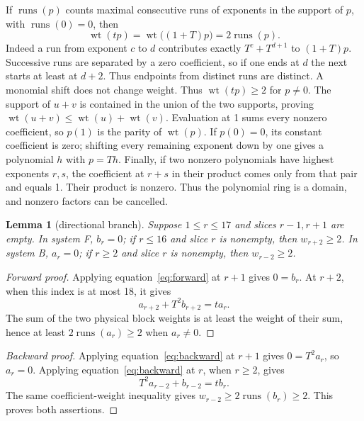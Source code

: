 \documentclass{article}
\newtheorem{lemma}{Lemma}
\DeclareMathOperator{\wt}{wt}
\DeclareMathOperator{\runs}{runs}
\begin{document}
If \(\runs(p)\) counts maximal consecutive runs of exponents in the support of
\(p\), with \(\runs(0)=0\), then
\begin{equation}\label{eq:runs}
  \wt(tp)=\wt\bigl((1+T)p\bigr)=2\runs(p).
\end{equation}
Indeed a run from exponent \(c\) to \(d\) contributes exactly \(T^c+T^{d+1}\)
to \((1+T)p\). Successive runs are separated by a zero coefficient, so if one
ends at \(d\) the next starts at least at \(d+2\). Thus endpoints from distinct
runs are distinct. A monomial shift does not change weight. Thus
\(\wt(tp)\ge 2\) for \(p\ne 0\).
The support of \(u+v\) is contained in the union of the two supports, proving
\(\wt(u+v)\le\wt(u)+\wt(v)\). Evaluation at 1 sums every nonzero coefficient,
so \(p(1)\) is the parity of \(\wt(p)\). If \(p(0)=0\), its constant coefficient
is zero; shifting every remaining exponent down by one gives a polynomial
\(h\) with \(p=Th\). Finally, if two nonzero polynomials have highest exponents
\(r,s\), the coefficient at \(r+s\) in their product comes only from that pair
and equals 1. Their product is nonzero. Thus the polynomial ring is a domain,
and nonzero factors can be cancelled.

\begin{lemma}[directional branch]\label{lem:branch}
  Suppose \(1\le r\le 17\) and slices \(r-1,r+1\) are empty. In system F,
  \(b_r=0\); if \(r\le 16\) and slice \(r\) is nonempty, then
  \(w_{r+2}\ge 2\). In system B, \(a_r=0\); if \(r\ge 2\) and slice \(r\) is
  nonempty, then \(w_{r-2}\ge 2\).
\end{lemma}

\begin{proof}[Forward proof]
%
  Applying equation~\eqref{eq:forward} at \(r+1\) gives \(0=b_r\).
  At \(r+2\), when this index is at most 18, it gives
  \begin{equation}
    a_{r+2}+T^2b_{r+2}=ta_r.
  \end{equation}
  The sum of the two physical block weights is at least the weight of their
  sum, hence at least \(2\runs(a_r)\ge 2\) when \(a_r\ne 0\).
\end{proof}

\begin{proof}[Backward proof]
  Applying equation~\eqref{eq:backward} at \(r+1\) gives \(0=T^2a_r\),
  so \(a_r=0\). Applying equation~\eqref{eq:backward} at \(r\), when
  \(r\ge 2\), gives
  \begin{equation}
    T^2a_{r-2}+b_{r-2}=tb_r.
  \end{equation}
  The same coefficient-weight inequality gives \(w_{r-2}\ge 2\runs(b_r)\ge 2\).
  This proves both assertions.
\end{proof}
\end{document}
